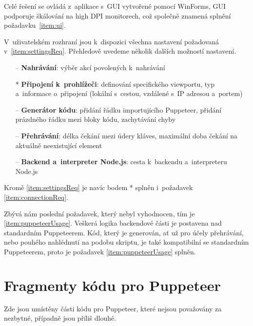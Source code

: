 \documentclass[12pt, a4paper, twoside]{article}
\begin{document}
	Celé řešení se ovládá z~aplikace s~GUI vytvořené pomocí WinForms, GUI podporuje škálování na high DPI monitorech, což společně znamená splnění požadavku~\cref{item:ui}.%
	
	V~uživatelském rozhraní jsou k~dispozici všechna nastavení požadovaná v~\ref{item:settingsReq}. Přehledově uvedeme několik dalších možností nastavení.
	\begin{itemize}
		\item[--] \textbf{Nahrávání}: výběr akcí povolených k~nahrávání
		\item[*] \textbf{Připojení k~prohlížeči}: definování specifického viewportu, typ a~informace o~připojení  (lokální s~cestou, vzdálené s~IP adresou a~portem)
		\item[--] \textbf{Generátor kódu}: přidání řádku importujícího Puppeteer, přidání prázdného řádku mezi bloky kódu, zachytávání chyby
		\item[--] \textbf{Přehrávání}: délka čekání mezi údery kláves, maximální doba čekání na aktuálně neexistující element
		\item[--] \textbf{Backend a~interpreter Node.js}: cesta k~backendu a~interpreteru Node.js
	\end{itemize}
	Kromě \ref{item:settingsReq} je navíc bodem * splněn i~požadavek \ref{item:connectionReq}.
	
	Zbývá nám poslední požadavek, který nebyl vyhodnocen, tím je \cref{item:puppeteerUsage}. Veškerá logika backendové části je postavena nad standardním Puppeteerem. Kód, který je generován, ať už pro účely přehrávání, nebo pouhého nahlédnutí na podobu skriptu, je také kompatibilní se standardním Puppeteerem, proto je požadavek \cref{item:puppeteerUsage} splněn.
	\newpage
	\setcounter{secnumdepth}{2}
	\setcounter{section}{0}
	\appendix
	\section{Fragmenty kódu pro Puppeteer}
	\label{appx:puppeteerCode}
	Zde jsou umístěny části kódu pro Puppeteer, které nejsou považovány za nezbytné, případně jsou příliš dlouhé.
\end{document}
